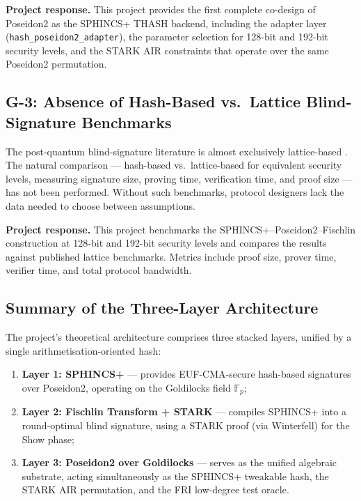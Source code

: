 \documentclass[11pt,a4paper]{article}
\newcommand{\Fp}{\mathbb{F}_p}
\newcommand{\EUFCMA}{\textsf{EUF-CMA}}
\begin{document}
\medskip
\noindent\textbf{Project response.}  This project provides the first complete co-design of
Poseidon2 as the SPHINCS+ THASH backend, including the adapter layer
(\texttt{hash\_poseidon2\_adapter}), the parameter selection for 128-bit and 192-bit security
levels, and the STARK AIR constraints that operate over the same Poseidon2 permutation.

\subsection{G-3: Absence of Hash-Based vs.\ Lattice Blind-Signature Benchmarks}

The post-quantum blind-signature literature is almost exclusively lattice-based
\cite{delPino2022Framework,Beullens2023LatticeBlind,Agrawal2022Practical}.  The natural
comparison --- hash-based vs.\ lattice-based for equivalent security levels, measuring
signature size, proving time, verification time, and proof size --- has not been performed.
Without such benchmarks, protocol designers lack the data needed to choose between assumptions.

\medskip
\noindent\textbf{Project response.}  This project benchmarks the SPHINCS+--Poseidon2--Fischlin
construction at 128-bit and 192-bit security levels and compares the results against published
lattice benchmarks.  Metrics include proof size, prover time, verifier time, and total protocol
bandwidth.

\subsection{Summary of the Three-Layer Architecture}

The project's theoretical architecture comprises three stacked layers, unified by a single
arithmetisation-oriented hash:

\begin{enumerate}
  \item \textbf{Layer 1: SPHINCS+} --- provides \EUFCMA-secure hash-based signatures over
        Poseidon2, operating on the Goldilocks field $\Fp$;
  \item \textbf{Layer 2: Fischlin Transform + STARK} --- compiles SPHINCS+ into a round-optimal
        blind signature, using a STARK proof (via Winterfell) for the Show phase;
  \item \textbf{Layer 3: Poseidon2 over Goldilocks} --- serves as the unified algebraic
        substrate, acting simultaneously as the SPHINCS+ tweakable hash, the STARK AIR
        permutation, and the FRI low-degree test oracle.
\end{enumerate}
\end{document}
